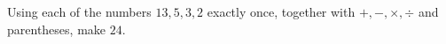 Using each of the numbers $13,5,3,2$ exactly once, together with $+,-,\times,\div$ and parentheses, make $24$.

